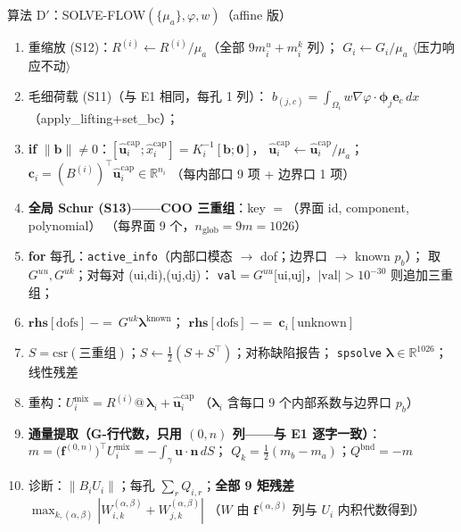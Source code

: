 \documentclass[11pt]{article}
\newcommand{\code}[1]{\texttt{#1}}
\newcommand{\iface}{\gamma}
\newcommand{\dd}{\,dx}
\newcommand{\iu}{\hat{\bm u}}
\newcommand{\kwd}[1]{\textbf{#1}}
\newcommand{\cmt}[1]{{\color{cmtclr}$\langle$#1$\rangle$}}
\newenvironment{pseudo}[1]{\begin{algobox}{#1}%
  \begin{enumerate}[label={\ttfamily\arabic*}, leftmargin=3.4em, itemsep=1.5pt, topsep=1pt, parsep=0pt]}%
  {\end{enumerate}\end{algobox}}
\begin{document}
\begin{pseudo}{算法 D$'$：SOLVE-FLOW$(\{\mu_a\},\varphi,w)$（affine 版）}
\item 重缩放 (S12)：$R^{(i)}\leftarrow R^{(i)}/\mu_a$（全部 $9m_i^u{+}m_i^k$ 列）；
$G_i\leftarrow G_i/\mu_a$ \cmt{压力响应不动}
\item 毛细荷载 (S11)（与 E1 相同，每孔 1 列）：
$b_{(j,c)}=\int_{\Omega_i}w\nabla\varphi\cdot\bm\phi_j\bm e_c\dd$（apply\_lifting$+$set\_bc）；
\item \kwd{if} $\|\bm b\|\neq0$：$[\iu^{\mathrm{cap}}_i;\hat x^{\mathrm{cap}}_i]=K_i^{-1}[\bm b;\bm 0]$，
$\iu^{\mathrm{cap}}_i\leftarrow\iu^{\mathrm{cap}}_i/\mu_a$；
$\bm c_i=(B^{(i)})^{\!\top}\iu^{\mathrm{cap}}_i\in\mathbb R^{n_i}$
（每内部口 9 项 + 边界口 1 项）
\item \textbf{全局 Schur (S13)——COO 三重组}：key $=$（界面 id, component, polynomial）
（每界面 9 个，$n_{\mathrm{glob}}=9m=1026$）
\item \kwd{for} 每孔：\code{active\_info}（内部口模态 $\to$ dof；边界口 $\to$ known $p_b$）；
取 $G^{uu},G^{uk}$；对每对 (ui,di),(uj,dj)：
\code{val}$=G^{uu}$[ui,uj]，$|\mathrm{val}|>10^{-30}$ 则追加三重组；
\item[] $\bm{rhs}[\mathrm{dofs}]\ {-}{=}\ G^{uk}\bm\lambda^{\mathrm{known}}$；
$\bm{rhs}[\mathrm{dofs}]\ {-}{=}\ \bm c_i[\text{unknown}]$
\item $S=\mathrm{csr}(\text{三重组})$；$S\leftarrow\tfrac12(S+S^{\!\top})$；对称缺陷报告；
\code{spsolve} $\bm\lambda\in\mathbb R^{1026}$；线性残差
\item 重构：$U_i^{\mathrm{mix}}=R^{(i)}@\,\bm\lambda_i+\iu^{\mathrm{cap}}_i$
（$\bm\lambda_i$ 含每口 9 个内部系数与边界口 $p_b$）
\item \textbf{通量提取（G-行代数，只用 $(0,n)$ 列——与 E1 逐字一致）}：
$m=\big(\bm f^{(0,n)}\big)^{\!\top}U_i^{\mathrm{mix}}=-\int_{\iface}\bm u\cdot\bm n\,dS$；
$Q_k=\tfrac12(m_b-m_a)$；$Q^{\mathrm{bnd}}=-m$
\item 诊断：$\|B_iU_i\|$；每孔 $\sum_rQ_{i,r}$；\textbf{全部 9 矩残差}
$\max_{k,(\alpha,\beta)}|W_{i,k}^{(\alpha,\beta)}+W_{j,k}^{(\alpha,\beta)}|$
（$W$ 由 $\bm f^{(\alpha,\beta)}$ 列与 $U_i$ 内积代数得到）
\end{pseudo}
\end{document}
